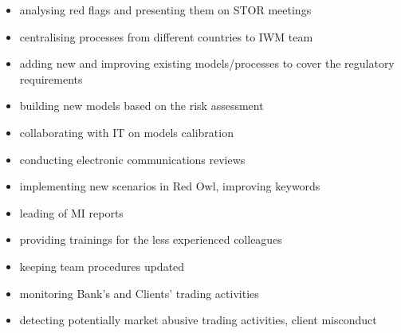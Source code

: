 
\begin{itemize}
	\item analysing red flags and presenting them on STOR meetings
	\item centralising processes from different countries to IWM team
	\item adding new and improving existing models/processes to cover the regulatory requirements
	\item building new models based on the risk assessment
	\item collaborating with IT on models calibration
	\item conducting electronic communications reviews
	\item implementing new scenarios in Red Owl, improving keywords
	\item leading of MI reports
	\item providing trainings for the less experienced colleagues
	\item keeping team procedures updated
\end{itemize}

\divider

\begin{itemize}
	\item monitoring Bank’s and Clients' trading activities
	\item detecting potentially market abusive trading activities, client misconduct
\end{itemize}

\divider


\divider


\divider

